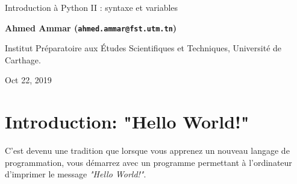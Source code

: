 \documentclass[%
oneside,                 %
final,                   %
10pt]{article}
\begin{document}

\newcommand{\exercisesection}[1]{\subsection*{#1}}






\thispagestyle{empty}

\begin{center}
{\LARGE\bf
\begin{spacing}{1.25}
Introduction à Python II : syntaxe et variables
\end{spacing}
}
\end{center}


\begin{center}
{\bf Ahmed Ammar (\texttt{ahmed.ammar@fst.utm.tn})}
\end{center}

    \begin{center}
\centerline{{\small Institut Préparatoire aux Études Scientifiques et Techniques, Université de Carthage.}}
\end{center}
    

\begin{center}
Oct 22, 2019
\end{center}

\vspace{1cm}


\tableofcontents


\vspace{1cm} %




\section{Introduction: "Hello World!"}
C'est devenu une tradition que lorsque vous apprenez un nouveau langage de programmation, vous démarrez avec un programme permettant à l'ordinateur d'imprimer le message \emph{"Hello World!"}.
\end{document}

